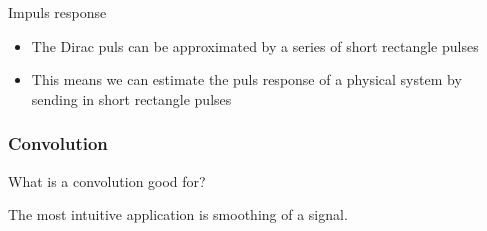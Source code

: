 \begin{frame}[t]{Impuls response}
    \begin{itemize}
        \item The Dirac puls can be approximated by a series of short rectangle pulses
        \item This means we can estimate the puls response of a physical system by sending in short rectangle pulses
    \end{itemize}

\end{frame}



\begin{frame}
    \frametitle{Convolution}
    \question{} What is a convolution good for?\newline

    \answer{} The most intuitive application is smoothing of a signal.\newline


\end{frame}
